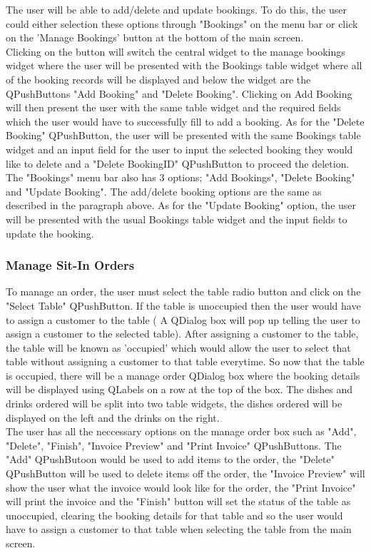 The user will be able to add/delete and update bookings. To do this, the user could either selection these options through "Bookings" on the menu bar or click on the 'Manage Bookings' button at the bottom of the main screen. \\

Clicking on the button will switch the central widget to the manage bookings widget where the user will be presented with the Bookings table widget where all of the booking records will be displayed and below the widget are the QPushButtons "Add Booking" and "Delete Booking". Clicking on Add Booking will then present the user with the same table widget and the required fields which the user would have to successfully fill to add a booking. As for the "Delete Booking"  QPushButton, the user will be presented with the same Bookings table widget and an input field for the user to input the selected booking they would like to delete and a "Delete BookingID" QPushButton to proceed the deletion. \\

The "Bookings" menu bar also has 3 options; "Add Bookings", "Delete Booking" and "Update Booking". The add/delete booking options are the same as described in the paragraph above. As for the "Update Booking" option, the user will be presented with the usual Bookings table widget and the input fields to update the booking.  

\subsubsection{Manage Sit-In Orders}

To manage an order, the user must select the table radio button and click on the "Select Table" QPushButton. If the table is unoccupied then the user would have to assign a customer to the table ( A QDialog box will pop up telling the user to assign a customer to the selected table). After assigning a customer to the table, the table will be known as 'occupied' which would allow the user to select that table without assigning a customer to that table everytime. So now that the table is occupied, there will be a manage order QDialog box where the booking details will be displayed using QLabels on a row at the top of the box. The dishes and drinks ordered will be split into two table widgets, the dishes ordered will be displayed on the left and the drinks on the right. \\

The user has all the neccessary options on the manage order box such as "Add", "Delete", "Finish", "Invoice Preview" and "Print Invoice" QPushButtons. The "Add" QPushButoon would be used to add items to the order, the "Delete" QPushButton will be used to delete items off the order, the "Invoice Preview" will show the user what the invoice would look like for the order, the "Print Invoice" will print the invoice and the "Finish" button will set the status of the table as unoccupied, clearing the booking details for that table and so the user would have to assign a customer to that table when selecting the table from the main screen.


